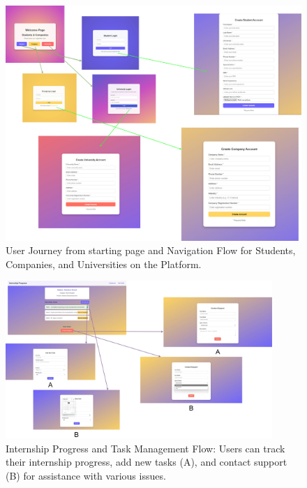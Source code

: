 
\begin{figure}[!htb]
\includegraphics[width=\textwidth, angle=0]{Images/Main1.png}
\caption{\label{fig:metamodel}User Journey from starting page and Navigation Flow for Students, Companies, and Universities on the Platform.}
\end{figure}

\begin{figure}[!h]
\centering
\includegraphics[width=0.9\textwidth, angle=0]{Images/Main2.jpg}
\caption{\label{fig:metamodel}Internship Progress and Task Management Flow: Users can track their internship progress, add new tasks (A), and contact support (B) for assistance with various issues.}
\end{figure}

